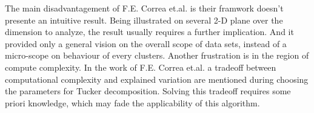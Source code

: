 \documentclass{sig-alternate}
\begin{document}
The main disadvantagement of F.E. Correa et.al. is their framwork doesn't presente an intuitive result. Being illustrated on several 2-D plane over the dimension to analyze, the result usually requires a further implication. And it provided only a general vision on the overall scope of data sets, instead of a micro-scope on behaviour of every clusters. Another frustration is in the region of compute complexity. In the work of F.E. Correa et.al. a tradeoff between computational complexity and explained variation are mentioned during choosing the parameters for Tucker decomposition. Solving this tradeoff requires some priori knowledge, which may fade the applicability of this algorithm.



\end{document}
